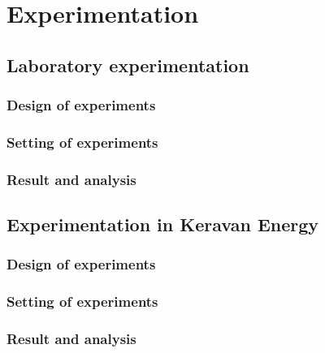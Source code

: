 
\chapter{Experimentation}

\section{Laboratory experimentation}
\subsection{Design of experiments}
\subsection{Setting of experiments}
\subsection{Result and analysis}

\section{Experimentation in Keravan Energy}
\subsection{Design of experiments}
\subsection{Setting of experiments}
\subsection{Result and analysis}

\clearpage %

